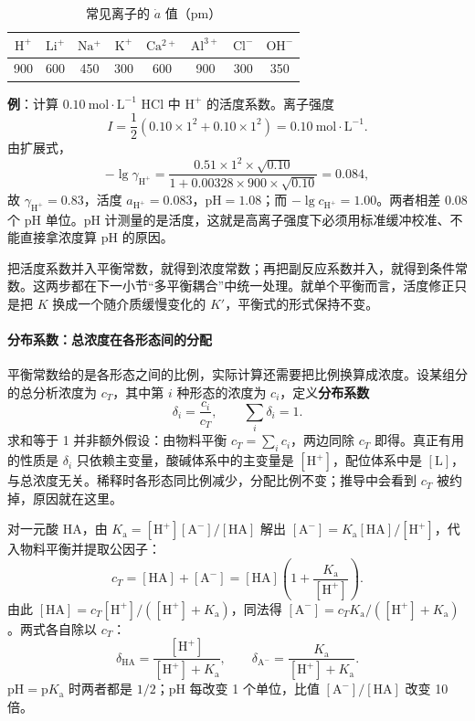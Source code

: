 \documentclass[UTF8]{ctexbook}
\begin{document}
\begin{table}[H]
\centering
\caption{常见离子的 \(\dot{a}\) 值（pm）}
\begin{tabular}{cccccccc}
\toprule
\(\mathrm{H^+}\) & \(\mathrm{Li^+}\) & \(\mathrm{Na^+}\) & \(\mathrm{K^+}\) & \(\mathrm{Ca^{2+}}\) & \(\mathrm{Al^{3+}}\) & \(\mathrm{Cl^-}\) & \(\mathrm{OH^-}\) \\
\midrule
900 & 600 & 450 & 300 & 600 & 900 & 300 & 350 \\
\bottomrule
\end{tabular}
\end{table}

\textbf{例}：计算 \(0.10\ \mathrm{mol\cdot L^{-1}}\) \(\mathrm{HCl}\) 中 \(\mathrm{H^+}\) 的活度系数。离子强度
\[
I=\frac{1}{2}\left(0.10\times1^2+0.10\times1^2\right)=0.10\ \mathrm{mol\cdot L^{-1}}.
\]
由扩展式，
\[
-\lg\gamma_{\mathrm{H^+}}
=\frac{0.51\times1^2\times\sqrt{0.10}}{1+0.00328\times900\times\sqrt{0.10}}
=0.084,
\]
故 \(\gamma_{\mathrm{H^+}}=0.83\)，活度 \(a_{\mathrm{H^+}}=0.083\)，\(\mathrm{pH}=1.08\)；而 \(-\lg c_{\mathrm{H^+}}=1.00\)。两者相差 0.08 个 \(\mathrm{pH}\) 单位。\(\mathrm{pH}\) 计测量的是活度，这就是高离子强度下必须用标准缓冲校准、不能直接拿浓度算 \(\mathrm{pH}\) 的原因。

把活度系数并入平衡常数，就得到浓度常数；再把副反应系数并入，就得到条件常数。这两步都在下一小节“多平衡耦合”中统一处理。就单个平衡而言，活度修正只是把 \(K\) 换成一个随介质缓慢变化的 \(K'\)，平衡式的形式保持不变。

\label{sec:delta}
\paragraph{分布系数：总浓度在各形态间的分配}

平衡常数给的是各形态之间的比例，实际计算还需要把比例换算成浓度。设某组分的总分析浓度为 \(c_T\)，其中第 \(i\) 种形态的浓度为 \(c_i\)，定义\textbf{分布系数}
\[
\delta_i=\frac{c_i}{c_T},\qquad \sum_i\delta_i=1 .
\]
求和等于 1 并非额外假设：由物料平衡 \(c_T=\sum_i c_i\)，两边同除 \(c_T\) 即得。真正有用的性质是 \(\delta_i\) 只依赖主变量，酸碱体系中的主变量是 \([\mathrm{H^+}]\)，配位体系中是 \([\mathrm{L}]\)，与总浓度无关。稀释时各形态同比例减少，分配比例不变；推导中会看到 \(c_T\) 被约掉，原因就在这里。

对一元酸 \(\mathrm{HA}\)，由 \(K_{\mathrm{a}}=[\mathrm{H^+}][\mathrm{A^-}]/[\mathrm{HA}]\) 解出 \([\mathrm{A^-}]=K_{\mathrm{a}}[\mathrm{HA}]/[\mathrm{H^+}]\)，代入物料平衡并提取公因子：
\[
c_T=[\mathrm{HA}]+[\mathrm{A^-}]
=[\mathrm{HA}]\left(1+\frac{K_{\mathrm{a}}}{[\mathrm{H^+}]}\right).
\]
由此 \([\mathrm{HA}]=c_T[\mathrm{H^+}]/([\mathrm{H^+}]+K_{\mathrm{a}})\)，同法得 \([\mathrm{A^-}]=c_TK_{\mathrm{a}}/([\mathrm{H^+}]+K_{\mathrm{a}})\)。两式各自除以 \(c_T\)：
\[
\delta_{\mathrm{HA}}=\frac{[\mathrm{H^+}]}{[\mathrm{H^+}]+K_{\mathrm{a}}},
\qquad
\delta_{\mathrm{A^-}}=\frac{K_{\mathrm{a}}}{[\mathrm{H^+}]+K_{\mathrm{a}}}.
\]
\(\mathrm{pH}=\mathrm{p}K_{\mathrm{a}}\) 时两者都是 \(1/2\)；\(\mathrm{pH}\) 每改变 1 个单位，比值 \([\mathrm{A^-}]/[\mathrm{HA}]\) 改变 10 倍。
\end{document}

